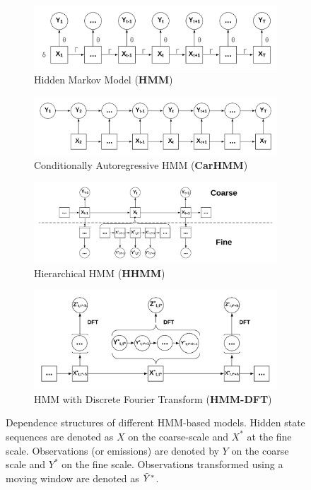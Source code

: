 \begin{figure}[ht]
    \begin{subfigure}{\textwidth}
      \centering
      \includegraphics[width=4in]{../Plots/HMM.png}  
      \caption{Hidden Markov Model (\textbf{HMM})}
      \label{fig:HMM}
    \end{subfigure}
    \newline
    \begin{subfigure}{\textwidth}
      \centering
      \includegraphics[width=4in]{../Plots/CarHMM.png}  
      \caption{Conditionally Autoregressive HMM (\textbf{CarHMM})}
      \label{fig:CarHMM}
    \end{subfigure}
    \newline
    \begin{subfigure}{\textwidth}
      \centering
      \includegraphics[width=4in]{../Plots/HHMM.png}  
      \caption{Hierarchical HMM (\textbf{HHMM})}
      \label{fig:HHMM}
    \end{subfigure}
    \newline
    \begin{subfigure}{\textwidth}
      \centering
      \includegraphics[width=4in]{../Plots/HMM-DFT.png}  
      \caption{HMM with Discrete Fourier Transform (\textbf{HMM-DFT})}
      \label{fig:HMM-DFT}
    \end{subfigure}
    \caption{Dependence structures of different HMM-based models. Hidden state sequences are denoted as $X$ on the coarse-scale and $X^*$ at the fine scale. Observations (or emissions) are denoted by $Y$ on the coarse scale and $Y^*$ on the fine scale. Observations transformed using a moving window are denoted as $\tilde{Y}^*$.}
    \label{fig:models}
\end{figure}

